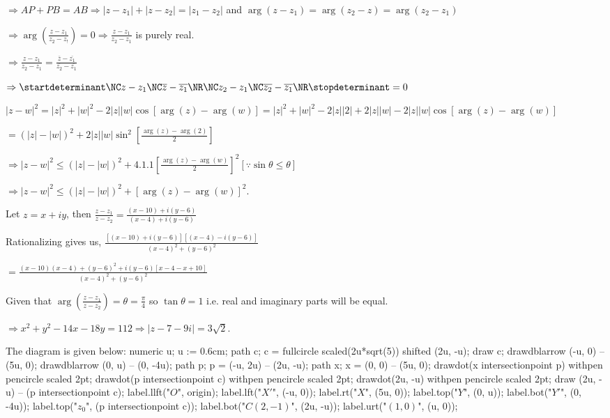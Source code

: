   $\Rightarrow AP + PB = AB\Rightarrow |z - z_1| + |z - z_2| = |z_1 - z_2|$ and $\arg(z - z_1) = \arg(z_2 -
  z) = \arg(z_2 - z_1)$

  $\Rightarrow \arg\left(\frac{z - z_1}{z_2 - z_!}\right) = 0\Rightarrow \frac{z - z_1}{z_2 - z_1}$ is
  purely real.

  $\Rightarrow \frac{z - z_1}{z_2 - z_1} = \frac{\overline{z} - \overline{z_1}}{\overline{z_2}
    -\overline{z_1}}$

  $\Rightarrow \startdeterminant\NC z - z_1\NC \overline{z} - \overline{z_1}\NR\NC z_2 -
  z_1\NC \overline{z_2} - \overline{z_1}\NR\stopdeterminant = 0$
\item $|z - w|^2 = |z|^2 + |w|^2 -2|z||w|\cos[\arg(z) - \arg(w)] = |z|^2 + |w|^2 - 2|z||2| + 2|z||w| -
  2|z||w|\cos[\arg(z) - \arg(w)]$

  $= \left(|z| - |w|\right)^2 + 2|z||w|\sin^2\left[\frac{\arg(z) - \arg(2)}{2}\right]$

  $\Rightarrow |z - w|^2\leq \left(|z| - |w|\right)^2 + 4.1.1\left[\frac{\arg(z)
      - \arg(w)}{2}\right]^2[\because \sin\theta\leq \theta]$

  $\Rightarrow |z - w|^2\leq \left(|z| - |w|\right)^2 + [\arg(z) - \arg(w)]^2$.
\item Let $z = x + iy$, then $\frac{z - z_1}{z - z_2} = \frac{(x - 10) + i(y - 6)}{(x - 4) + i(y - 6)}$

  Rationalizing gives us, $\frac{[(x - 10) + i(y - 6)][(x - 4) - i(y - 6)]}{(x - 4)^2 + (y - 6)^2}$

  $= \frac{(x - 10)(x - 4) + (y - 6)^2 + i(y - 6)[x - 4 - x + 10]}{(x - 4)^2 + (y - 6)^2}$

  Given that $\arg\left(\frac{z - z_1}{z - z_2}\right) = \theta = \frac{\pi}{4}$ so $\tan\theta = 1$
  i.e. real and imaginary parts will be equal.

  $\Rightarrow x^2 + y^2 - 14x - 18y = 112 \Rightarrow |z - 7 - 9i| = 3\sqrt{2}$.
\item The diagram is given below:
  \startplacefigure[location=force]
    \startMPcode
      numeric u;
      u := 0.6cm;
      path c;
      c = fullcircle scaled(2u*sqrt(5)) shifted (2u, -u);
      draw c;
      drawdblarrow (-u, 0) -- (5u, 0);
      drawdblarrow (0, u) -- (0, -4u);
      path p;
      p = (-u, 2u) -- (2u, -u);
      path x;
      x = (0, 0) -- (5u, 0);
      drawdot(x intersectionpoint p) withpen pencircle scaled 2pt;
      drawdot(p intersectionpoint c) withpen pencircle scaled 2pt;
      drawdot(2u, -u) withpen pencircle scaled 2pt;
      draw (2u, -u) -- (p intersectionpoint c);
      label.llft("$O$", origin);
      label.lft("$X'$", (-u, 0));
      label.rt("$X$", (5u, 0));
      label.top("$Y$", (0, u));
      label.bot("$Y'$", (0, -4u));
      label.top("$z_0$", (p intersectionpoint c));
      label.bot("$C(2, -1)$", (2u, -u));
      label.urt("$(1, 0)$", (u, 0));
    \stopMPcode
  \stopplacefigure

